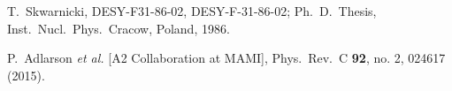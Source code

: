 \documentclass[aps,prc,twocolumn,floatfix,showpacs,preprintnumbers,amsmath,amssymb,superscriptaddress,linenumbers]{revtex4-1}
\begin{document}
\begin{thebibliography}{99}
  T.~Skwarnicki,
  DESY-F31-86-02, DESY-F-31-86-02;
  Ph.~D.~Thesis, Inst.\ Nucl.\ Phys.\ Cracow, Poland, 1986.

  P.~Adlarson {\it et al.} [A2 Collaboration at MAMI],
  Phys.\ Rev.\ C {\bf 92}, no. 2, 024617 (2015).
\end{thebibliography}
\end{document}
